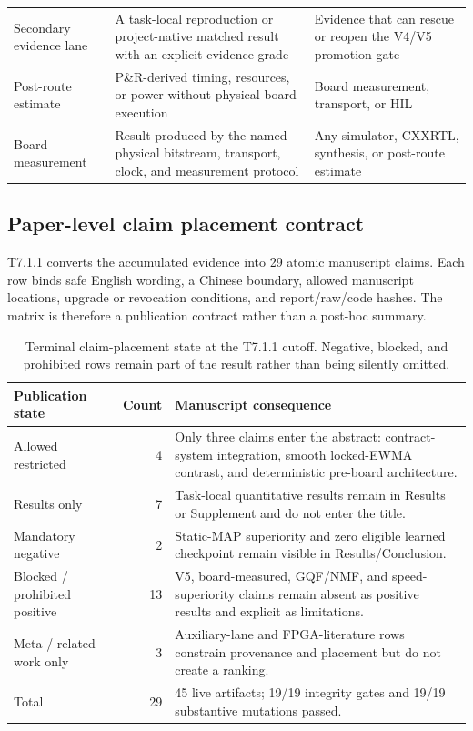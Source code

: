 \documentclass[11pt]{article}
\begin{document}
\begin{table}[htbp]
\begin{tabularx}{\textwidth}{@{}L{0.22\textwidth} L{0.30\textwidth} Y@{}}
Secondary evidence lane & A task-local reproduction or project-native matched result with an explicit evidence grade & Evidence that can rescue or reopen the V4/V5 promotion gate \\
Post-route estimate & P\&R-derived timing, resources, or power without physical-board execution & Board measurement, transport, or HIL \\
Board measurement & Result produced by the named physical bitstream, transport, clock, and measurement protocol & Any simulator, CXXRTL, synthesis, or post-route estimate \\
\bottomrule
\end{tabularx}
\end{table}

\subsection{Paper-level claim placement contract}

T7.1.1 converts the accumulated evidence into 29 atomic manuscript claims.
Each row binds safe English wording, a Chinese boundary, allowed manuscript
locations, upgrade or revocation conditions, and report/raw/code hashes.  The
matrix is therefore a publication contract rather than a post-hoc summary.

\begin{table}[htbp]
\centering
\small
\caption{Terminal claim-placement state at the T7.1.1 cutoff.  Negative,
blocked, and prohibited rows remain part of the result rather than being
silently omitted.}
\label{tab:claim-placement}
\begin{tabularx}{\textwidth}{@{}L{0.25\textwidth} r Y@{}}
\toprule
Publication state & Count & Manuscript consequence \\
\midrule
Allowed restricted & 4 & Only three claims enter the abstract: contract-system integration, smooth locked-EWMA contrast, and deterministic pre-board architecture. \\
Results only & 7 & Task-local quantitative results remain in Results or Supplement and do not enter the title. \\
Mandatory negative & 2 & Static-MAP superiority and zero eligible learned checkpoint remain visible in Results/Conclusion. \\
Blocked / prohibited positive & 13 & V5, board-measured, GQF/NMF, and speed-superiority claims remain absent as positive results and explicit as limitations. \\
Meta / related-work only & 3 & Auxiliary-lane and FPGA-literature rows constrain provenance and placement but do not create a ranking. \\
\midrule
Total & 29 & 45 live artifacts; 19/19 integrity gates and 19/19 substantive mutations passed. \\
\bottomrule
\end{tabularx}
\end{table}
\end{document}
